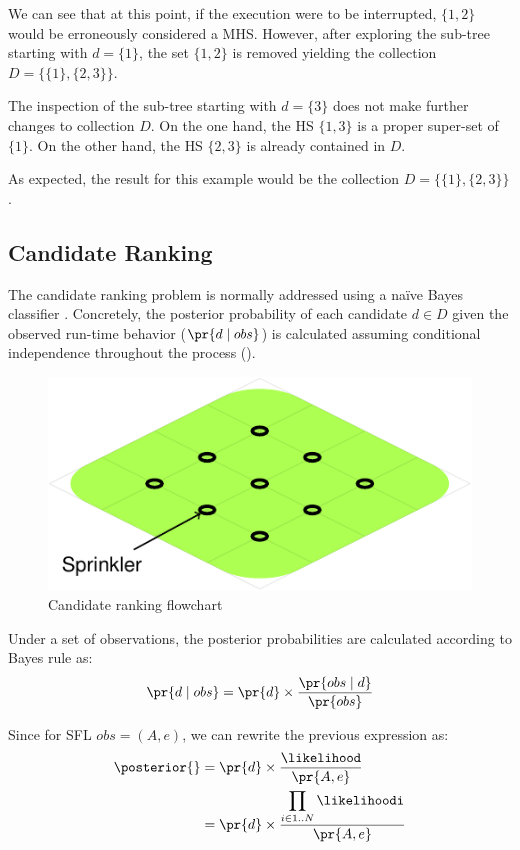 We can see that at this point, if the execution were to be
interrupted, $\{1,2\}$ would be erroneously considered a \ac{MHS}.
%
However, after exploring the sub-tree starting with $d = \{1\}$,
the set $\{1,2\}$
is removed yielding the collection $D=\{\{1\},\{2,3\}\}$.

The inspection of the sub-tree starting with $d = \{3\}$
does not make further changes to collection $D$.
%
On the one hand, the \ac{HS} $\{1,3\}$ is a proper super-set of
$\{1\}$.
%
On the other hand, the \ac{HS} $\{2,3\}$ is already contained in
$D$.
%

As expected, the result for this example would be the collection
$D=\{\{1\},\{2,3\}\}$.
%
\FloatBarrier
\subsection{Candidate Ranking}
\label{sec:intro:candidate-ranking}
The candidate ranking problem is normally addressed using a na\"{i}ve
Bayes classifier \cite{Abreu09a,Kleer09}.
%
Concretely, the posterior probability of each candidate $d \in D$
given the observed run-time behavior ($\pr{d \mid obs}$) is calculated
assuming conditional independence throughout the process
().

\begin{figure}[!ht]
  \includegraphics[scale=0.9,page=15]{figures/introduction/figures/main.pdf}
  \caption{Candidate ranking flowchart\label{fig:intro:cr-flowchart}}
\end{figure}


Under a set of observations, the posterior probabilities are
calculated according to Bayes rule as:
%
\begin{equation}
  \pr{d\mid obs} = \pr{d} \times \frac{\pr{obs\mid d}}{\pr{obs}}
\end{equation}

Since for \ac{SFL} $obs = (A,e)$, we can rewrite the previous
expression as:
\begin{equation}
  \begin{split}
    \posterior{}   & =  \pr{d} \times \frac{\displaystyle \likelihood}{\pr{A, e}} \\
    & =  \pr{d} \times\frac{\displaystyle \prod_{i \in 1..N} \likelihoodi}{\pr{A, e}}
  \end{split}
\end{equation}


